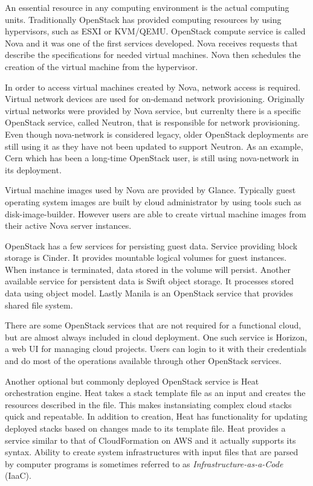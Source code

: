 \documentclass[officiallayout]{tktla}
\begin{document}
An essential resource in any computing environment is the actual computing
units. Traditionally OpenStack has provided computing resources by using
hypervisors, such as ESXI or KVM/QEMU. OpenStack compute service is called
Nova and it was one of the first services developed. Nova receives requests
that describe the specifications for needed virtual machines. Nova then
schedules the creation of the virtual machine from the hypervisor.

In order to access virtual machines created by Nova, network access is
required. Virtual network devices are used for on-demand network provisioning.
Originally virtual networks were provided by Nova service, but currenlty there
is a specific OpenStack service, called Neutron, that is responsible for
network provisioning. Even though nova-network is considered legacy, older
OpenStack deployments are still using it as they have not been updated to
support Neutron. As an example, Cern which has been a long-time OpenStack user,
is still using nova-network in its deployment.

Virtual machine images used by Nova are provided by Glance. Typically guest
operating system images are built by cloud administrator by using tools such as
disk-image-builder. However users are able to create virtual machine images
from their active Nova server instances.

OpenStack has a few services for persisting guest data. Service providing block
storage is Cinder. It provides mountable logical volumes for guest instances.
When instance is terminated, data stored in the volume will persist. Another
available service for persistent data is Swift object storage. It processes
stored data using object model. Lastly Manila is an OpenStack service that
provides shared file system.

There are some OpenStack services that are not required for a functional cloud,
but are almost always included in cloud deployment. One such service is
Horizon, a web UI for managing cloud projects. Users can login to it with their
credentials and do most of the operations available through other OpenStack
services.

Another optional but commonly deployed OpenStack service is Heat orchestration
engine. Heat takes a stack template file as an input and creates the resources
described in the file. This makes instansiating complex cloud stacks quick and
repeatable. In addition to creation, Heat has functionality for updating
deployed stacks based on changes made to its template file. Heat provides a
service similar to that of CloudFormation on AWS and it actually supports its
syntax. Ability to create system infrastructures with input files that are
parsed by computer programs is sometimes referred to as
\textit{Infrastructure-as-a-Code} (IaaC).
\end{document}
